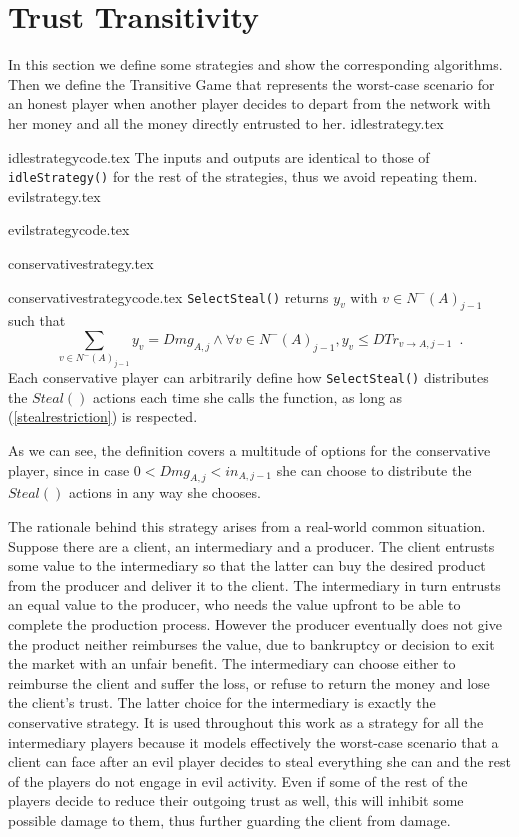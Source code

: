 \section{Trust Transitivity}
  In this section we define some strategies and show the corresponding algorithms. Then we define the
  Transitive Game that represents the worst-case scenario for an honest player when another player decides to depart from
  the network with her money and all the money directly entrusted to her.
  {idlestrategy.tex}

  {idlestrategycode.tex}
  The inputs and outputs are identical to those of \texttt{idleStrategy()} for the rest of the strategies, thus we avoid
  repeating them.
  {evilstrategy.tex}

  {evilstrategycode.tex}

  {conservativestrategy.tex}

  {conservativestrategycode.tex}
  \texttt{SelectSteal()} returns $y_v$ with $v \in N^{-}\left(A\right)_{j-1}$ such that
  \begin{equation}
  \label{stealrestriction}
    \sum\limits_{v \in N^{-}\left(A\right)_{j-1}}y_v = Dmg_{A, j} \wedge \forall v \in N^{-}\left(A\right)_{j-1},
    y_v \leq DTr_{v \rightarrow A, j-1} \enspace.
  \end{equation}
  Each conservative player can arbitrarily define how \texttt{SelectSteal()} distributes the $Steal\left(\right)$ actions
  each time she calls the function, as long as (\ref{stealrestriction}) is respected.

  As we can see, the definition covers a multitude of options for the conservative player, since in case $0 < Dmg_{A,j}
  < in_{A,j-1}$ she can choose to distribute the $Steal\left(\right)$ actions in any way she chooses.

  The rationale behind this strategy arises from a real-world common situation. Suppose there are a client, an
  intermediary and a producer. The client entrusts some value to the intermediary so that the latter can buy the desired
  product from the producer and deliver it to the client. The intermediary in turn entrusts an equal value to the
  producer, who needs the value upfront to be able to complete the production process. However the producer eventually
  does not give the product neither reimburses the value, due to bankruptcy or decision to exit the market with an unfair
  benefit. The intermediary can choose either to reimburse the client and suffer the loss, or refuse to return the money
  and lose the client's trust. The latter choice for the intermediary is exactly the conservative strategy. It is used
  throughout this work as a strategy for all the intermediary players because it models effectively the worst-case
  scenario that a client can face after an evil player decides to steal everything she can and the rest of the players do
  not engage in evil activity. Even if some of the rest of the players decide to reduce their outgoing trust as well, this
  will inhibit some possible damage to them, thus further guarding the client from damage.

